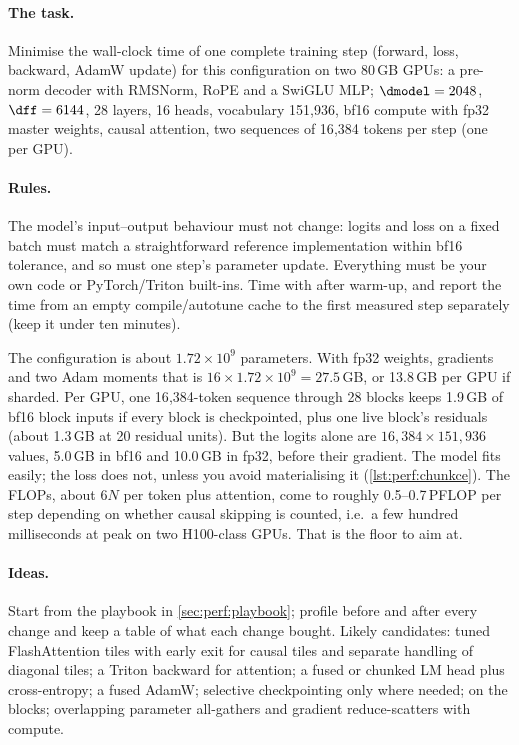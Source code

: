 \paragraph{The task.} Minimise the wall-clock time of one complete training step (forward, loss,
backward, AdamW update) for this configuration on two 80\,GB GPUs:
a pre-norm decoder with RMSNorm, RoPE and a SwiGLU MLP; $\dmodel=2048$, $\dff=6144$, 28 layers,
16 heads, vocabulary 151{,}936, bf16 compute with fp32 master weights, causal attention, two
sequences of 16{,}384 tokens per step (one per GPU).

\paragraph{Rules.} The model's input--output behaviour must not change: logits and loss on a fixed
batch must match a straightforward reference implementation within bf16 tolerance, and so must one
step's parameter update. Everything must be your own code or PyTorch/Triton built-ins. Time with
 after warm-up, and report the time from an empty compile/autotune
cache to the first measured step separately (keep it under ten minutes).

\begin{napkinmath}
The configuration is about $1.72\times10^9$ parameters. With fp32 weights, gradients and two Adam
moments that is $16\times1.72\times10^9=27.5$\,GB, or 13.8\,GB per GPU if sharded. Per GPU, one
16{,}384-token sequence through 28 blocks keeps 1.9\,GB of bf16 block inputs if every block is
checkpointed, plus one live block's residuals (about 1.3\,GB at 20 residual units). But the logits
alone are $16{,}384\times151{,}936$ values, 5.0\,GB in bf16 and 10.0\,GB in fp32, before their gradient.
The model fits easily; the loss does not, unless you avoid materialising it (\cref{lst:perf:chunkce}).
The FLOPs, about $6N$ per token plus attention, come to roughly 0.5--0.7\,PFLOP per step depending on
whether causal skipping is counted, i.e.\ a few hundred milliseconds at peak on two H100-class GPUs.
That is the floor to aim at.
\end{napkinmath}

\paragraph{Ideas.} Start from the playbook in \cref{sec:perf:playbook}; profile before and after
every change and keep a table of what each change bought. Likely candidates: tuned FlashAttention
tiles with early exit for causal tiles and separate handling of diagonal tiles; a Triton backward for
attention; a fused or chunked LM head plus cross-entropy; a fused AdamW; selective checkpointing
only where needed;  on the blocks; overlapping parameter all-gathers and
gradient reduce-scatters with compute.

